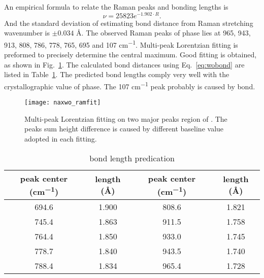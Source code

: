 An empirical formula to relate the Raman peaks and  bonding lengths\cite{Hardcastle1995} is
\begin{equation}\label{eq:wobond}
\nu = 25823 e^{-1.902\cdot R}.
\end{equation}
And the standard deviation of estimating  bond distance from Raman stretching wavenumber is $\pm0.034$ \AA. The observed Raman peaks of  phase lies at 965, 943, 913, 808, 786, 778, 765, 695 and 107 \si{cm^{-1}}. Multi-peak Lorentzian fitting is preformed to precisely determine the central maximum. Good fitting is obtained, as shown in Fig.~\ref{fig:naworamfit}. The calculated  bond distances using Eq.~\ref{eq:wobond} are listed in Table~\ref{tab:nawobond}. The predicted  bond lengths comply very well with the crystallographic value of  phase.\cite{Triantafyllou1999a} The 107 \si{cm^{-1}} peak probably is caused by  bond.
\begin{figure}[htb]
\centering
\texttt{[image: naxwo\_ramfit]}
\caption[ Raman fitting]{Multi-peak Lorentzian fitting on two major peaks region of . The peaks sum height difference is caused by different baseline value adopted in each fitting.}
\label{fig:naworamfit}
\end{figure}

\begin{table}[htb]
\centering
\caption{ bond length predication}\label{tab:nawobond}
\begin{tabular}{cccc}
\toprule
peak center (\si{cm^{-1}}) & length (\AA) & peak center (\si{cm^{-1}}) & length (\AA) \\
\midrule
694.6 & 1.900 &  808.6 &  1.821 \\
745.4 & 1.863 &  911.5 &  1.758 \\
764.4 & 1.850 &  933.0 &  1.745 \\
778.7 & 1.840 &   943.5 & 1.740 \\
788.4 & 1.834 &   965.4 & 1.728 \\
\bottomrule
\end{tabular}
\end{table}



